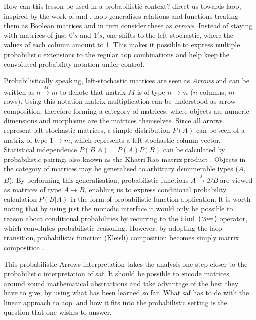 \documentclass[
  oneside,
  11pt, a4paper,
  footinclude=true,
  headinclude=true,
  cleardoublepage=empty
]{scrbook}
\theoremstyle{definition}
\theoremstyle{definition}
\def\bind{\mathbin{{>\hskip-1ex>\hskip-.4ex=}}}
\begin{document}
	        How can this lesson be used in a probabilistic context? \cite{Oliveira2016KeepDC} direct us towards \gls{laop}, inspired by the work of \cite{Macedo2012MatricesAA} and \cite{oliveira2012towards}. \gls{laop} generalises relations and functions treating them as Boolean matrices and in turn consider these as \emph{arrows}. Instead of staying with matrices of just $0's$ and $1's$, one shifts to the  left-stochastic, where the values of each column amount to 1. This makes it possible to express multiple probabilistic extensions to the regular \gls{aop} combinations and help keep the convoluted probability notation under control.
	        
	        Probabilistically speaking, left-stochastic matrices are seen as \emph{Arrows} and can be written as $n \xrightarrow{M} m$ to denote that matrix $M$ is of type $n \longrightarrow m$ ($n$ columns, $m$ rows). Using this notation matrix multiplication can be understood as arrow composition, therefore forming a category of matrices, where objects are numeric dimensions and morphisms are the matrices themselves. Since all arrows represent left-stochastic matrices, a simple distribution $P(A)$ can be seen of a matrix of type $1 \longrightarrow m$, which represents a left-stochastic column vector. Statistical independence $P(B|A) = P(A)P(B)$ can be calculated by probabilistic pairing, also known as the Khatri-Rao matrix product \citep{Macedo2012MatricesAA, murta2013calculating}. Objects in the category of matrices may be generalised to arbitrary denumerable types ($A$, $B$). By performing this generalisation, probabilistic functions $A \xrightarrow{f} \mathscr{D}B$ are viewed as matrices of type $A \longrightarrow B$, enabling us to express conditional probability calculation $P(B|A)$ in the form of probabilistic function application. It is worth noting that by using just the monadic interface it would only be possible to reason about conditional probabilities by recurring to the \texttt{bind ($\bind$)} operator, which convolutes probabilistic reasoning. However, by adopting the \gls{laop} transition, probabilistic function (Kleisli) composition becomes simply matrix composition \citep{oliveira2012towards}.
	        
	        This probabilistic Arrows interpretation takes the analysis one step closer to the probabilistic interpretation of \gls{saf}. It should be possible to encode matrices around sound mathematical abstractions and take advantage of the best they have to give, by using what has been learned so far. What \gls{saf} has to do with the linear approach to \gls{aop}, and how it fits into the probabilistic setting is the question that one wishes to answer.
	    
\end{document}
